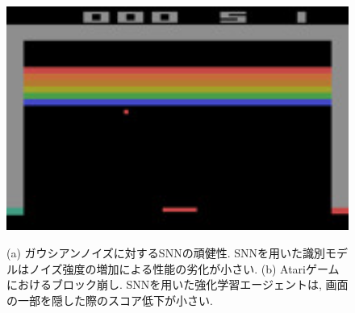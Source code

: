 \begin{figure}[htb]
    \centering

    \begin{minipage}{0.45\textwidth}
        \centering
        
        \label{fig:robust:gaussian}
    \end{minipage}
    \hspace{0.02\textwidth}
    \begin{minipage}{0.45\textwidth}
        \centering
        \includegraphics[width=1.0\textwidth]{Static/chap1_robust_atari.jpg}
        \label{fig:robust:atari}
    \end{minipage}

    \caption[SNNの頑健性]{
        (a) ガウシアンノイズに対するSNNの頑健性. 
        SNNを用いた識別モデルはノイズ強度の増加による性能の劣化が小さい.
        (b) Atariゲームにおけるブロック崩し.
        SNNを用いた強化学習エージェントは, 画面の一部を隠した際のスコア低下が小さい.
    }
\end{figure}

